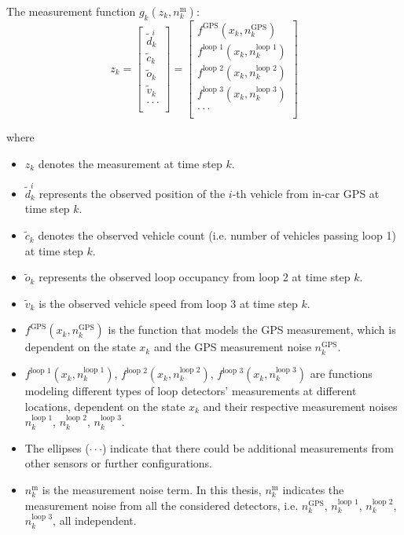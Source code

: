 The measurement function $g_k(z_k, n_k^\text{m})$: 
\begin{equation}
    z_k = \begin{bmatrix}
\text{$\tilde d_k^i$} \\
\text{$\tilde c_k$} \\
\text{$\tilde o_k$} \\
\text{$\tilde v_k$} \\
\text{$\cdot \cdot \cdot$} \\
\end{bmatrix}
= \begin{bmatrix}
\text{$f^\text{GPS}(x_k, n_k^\text{GPS})$} \\
\text{$f^\text{loop 1}(x_k, n_k^\text{loop 1})$} \\
\text{$f^\text{loop 2}(x_k, n_k^\text{loop 2})$} \\
\text{$f^\text{loop 3}(x_k, n_k^\text{loop 3})$} \\
\text{$\cdot \cdot \cdot$} \\
\end{bmatrix}
\end{equation}

where
\begin{itemize}
    \item $z_k$  denotes the measurement at time step $k$.
    \item $\tilde d_k^i$ represents the observed position of the $i$-th vehicle from in-car GPS at time step $k$.
    \item $\tilde c_k$ denotes the observed vehicle count (i.e. number of vehicles passing loop 1) at time step $k$.
    \item $\tilde o_k$ represents the observed loop occupancy from loop 2 at time step $k$.
    \item $\tilde v_k$ is the observed vehicle speed from loop 3 at time step $k$.
    \item $f^\text{GPS}(x_k, n_k^\text{GPS})$ is the function that models the GPS measurement, which is dependent on the state $x_k$ and the GPS measurement noise $n_k^\text{GPS}$.
    \item $f^\text{loop 1}(x_k, n_k^\text{loop 1})$, $f^\text{loop 2}(x_k, n_k^\text{loop 2})$, $f^\text{loop 3}(x_k, n_k^\text{loop 3})$ are functions modeling different types of loop detectors' measurements at different locations, dependent on the state $x_k$ and their respective measurement noises $n_k^\text{loop 1}$, $n_k^\text{loop 2}$, $n_k^\text{loop 3}$.
    \item The ellipses ($\cdot \cdot \cdot$) indicate that there could be additional measurements from other sensors or further configurations.
    \item $n_k^\text{m}$ is the measurement noise term. In this thesis, $n_k^\text{m}$ indicates the measurement noise from all the considered detectors, i.e. $n_k^\text{GPS}$,  $n_k^\text{loop 1}$, $n_k^\text{loop 2}$, $n_k^\text{loop 3}$, all independent.
\end{itemize}

